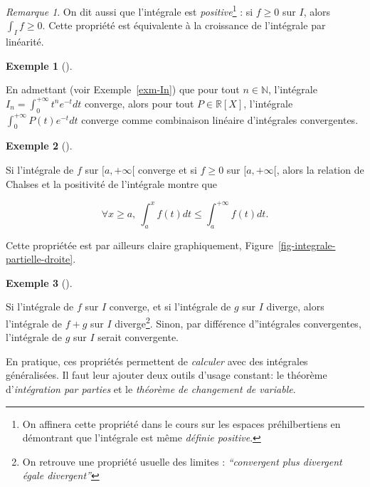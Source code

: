 \documentclass[
  french,
  letterpaper,
  DIV=11,
  numbers=noendperiod]{scrreprt}
\theoremstyle{plain}
\theoremstyle{definition}
\theoremstyle{plain}
\theoremstyle{plain}
\theoremstyle{definition}
\theoremstyle{definition}
\newtheorem{example}{Exemple}[chapter]
\theoremstyle{plain}
\theoremstyle{remark}
\newtheorem{refremark}{Remarque}[chapter]
\begin{document}
\begin{refremark}
On dit aussi que l'intégrale est \emph{positive}\footnote{On affinera
  cette propriété dans le cours sur les espaces préhilbertiens en
  démontrant que l'intégrale est même \emph{définie positive}.} : si
\(f \geqslant 0\) sur \(I\), alors \(\int_If \geqslant 0\). Cette
propriété est équivalente à la croissance de l'intégrale par linéarité.

\label{rem-positivite}

\end{refremark}

\begin{example}[]\protect\hypertarget{exm-linearite}{}\label{exm-linearite}

En admettant (voir Exemple~\ref{exm-In}) que pour tout
\(n \in \mathbb{N}\), l'intégrale
\(I_{n}=\int_{0}^{+\infty}t^{n}e^{-t}dt\) converge, alors pour tout
\(P \in
\mathbb{R}[X]\), l'intégrale \(\int_{0}^{+\infty}P(t)e^{-t}dt\) converge
comme combinaison linéaire d'intégrales convergentes.

\end{example}

\begin{example}[]\protect\hypertarget{exm-majoration}{}\label{exm-majoration}

Si l'intégrale de \(f\) sur \([a,+\infty[\) converge et si
\(f \geqslant 0\) sur \([a,+\infty[\), alors la relation de Chalses et
la positivité de l'intégrale montre que

\[
    \forall x \geqslant a,\ \int_{a}^{x}f(t)dt \leqslant \int_{a}^{+\infty}f(t)dt.
\]

Cette propriétée est par ailleurs claire graphiquement,
Figure~\ref{fig-integrale-partielle-droite}.

\end{example}

\begin{example}[]\protect\hypertarget{exm-contrapose}{}\label{exm-contrapose}

Si l'intégrale de \(f\) sur \(I\) converge, et si l'intégrale de \(g\)
sur \(I\) diverge, alors l'intégrale de \(f+g\) sur \(I\)
diverge\footnote{On retrouve une propriété usuelle des limites :
  \emph{``convergent plus divergent égale divergent''}}. Sinon, par
différence d''intégrales convergentes, l'intégrale de \(g\) sur \(I\)
serait convergente.

\end{example}

En pratique, ces propriétés permettent de \emph{calculer} avec des
intégrales généralisées. Il faut leur ajouter deux outils d'usage
constant: le théorème d'\emph{intégration par parties} et le
\emph{théorème de changement de variable}.
\end{document}
